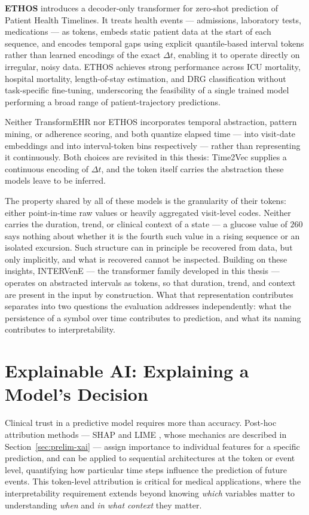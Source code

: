 \textbf{ETHOS} \citep{zero-shot-health-trajectory-prediction-transformer} introduces a decoder-only transformer for zero-shot prediction of Patient Health Timelines. It treats health events --- admissions, laboratory tests, medications --- as tokens, embeds static patient data at the start of each sequence, and encodes temporal gaps using explicit quantile-based interval tokens rather than learned encodings of the exact $\Delta t$, enabling it to operate directly on irregular, noisy data. ETHOS achieves strong performance across ICU mortality, hospital mortality, length-of-stay estimation, and DRG classification without task-specific fine-tuning, underscoring the feasibility of a single trained model performing a broad range of patient-trajectory predictions.

Neither TransformEHR nor ETHOS incorporates temporal abstraction, pattern mining, or adherence scoring, and both quantize elapsed time --- into visit-date embeddings and into interval-token bins respectively --- rather than representing it continuously. Both choices are revisited in this thesis: Time2Vec \citep{kazemi2019time2vec} supplies a continuous encoding of $\Delta t$, and the token itself carries the abstraction these models leave to be inferred.

The property shared by all of these models is the granularity of their tokens: either point-in-time raw values or heavily aggregated visit-level codes. Neither carries the duration, trend, or clinical context of a state --- a glucose value of $260$ says nothing about whether it is the fourth such value in a rising sequence or an isolated excursion. Such structure can in principle be recovered from data, but only implicitly, and what is recovered cannot be inspected. Building on these insights, INTERVenE --- the transformer family developed in this thesis --- operates on abstracted intervals as tokens, so that duration, trend, and context are present in the input by construction. What that representation contributes separates into two questions the evaluation addresses independently: what the persistence of a symbol over time contributes to prediction, and what its naming contributes to interpretability.

\section{Explainable AI: Explaining a Model's Decision}
\label{sec:rw-xai}

Clinical trust in a predictive model requires more than accuracy. Post-hoc attribution methods --- SHAP \citep{unified-approach-interpreting-model-predictions} and LIME \citep{why-should-i-trust-you-explaining-predictions-any-classifier}, whose mechanics are described in Section~\ref{sec:prelim-xai} --- assign importance to individual features for a specific prediction, and can be applied to sequential architectures at the token or event level, quantifying how particular time steps influence the prediction of future events. This token-level attribution is critical for medical applications, where the interpretability requirement extends beyond knowing \emph{which} variables matter to understanding \emph{when} and \emph{in what context} they matter.

